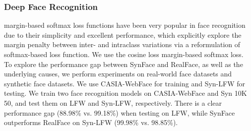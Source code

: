 \documentclass[12pt]{article}
\begin{document}
\subsubsection{Deep Face Recognition}
margin-based softmax loss
functions have been very popular in face recognition due to
their simplicity and excellent performance, which explicitly explore the margin penalty between inter- and intraclass variations via a reformulation of softmax-based loss
function. We use the cosine loss margin-based softmax loss.\\
To explore the performance gap between SynFace and
RealFace, as well as the underlying causes, we perform
experiments on real-world face datasets and synthetic face
datasets. We use CASIA-WebFace for
training and Syn-LFW for testing. We train two face recognition models on CASIA-WebFace and Syn 10K 50, and test them on
LFW and Syn-LFW, respectively. There is a clear performance gap (88.98\% vs. 99.18\%) when
testing on LFW, while SynFace outperforms RealFace on
Syn-LFW (99.98\% vs. 98.85\%).
\end{document}
